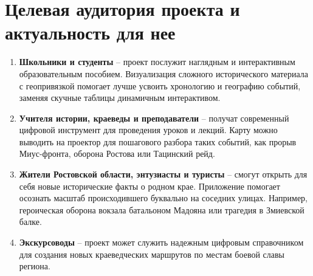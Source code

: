 \documentclass[a4paper,12pt]{article}
\begin{document}
\section*{Целевая аудитория проекта и актуальность для нее}
\begin{enumerate}
    \item \textbf{Школьники и студенты} – проект послужит наглядным и интерактивным образовательным пособием. Визуализация сложного исторического материала с геопривязкой помогает лучше усвоить хронологию и географию событий, заменяя скучные таблицы динамичным интерактивом.
    \item \textbf{Учителя истории, краеведы и преподаватели} – получат современный цифровой инструмент для проведения уроков и лекций. Карту можно выводить на проектор для пошагового разбора таких событий, как прорыв Миус-фронта, оборона Ростова или Тацинский рейд.
    \item \textbf{Жители Ростовской области, энтузиасты и туристы} – смогут открыть для себя новые исторические факты о родном крае. Приложение помогает осознать масштаб происходившего буквально на соседних улицах. Например, героическая оборона вокзала батальоном Мадояна или трагедия в Змиевской балке.
    \item \textbf{Экскурсоводы} – проект может служить надежным цифровым справочником для создания новых краеведческих маршрутов по местам боевой славы региона.
\end{enumerate}
\end{document}
